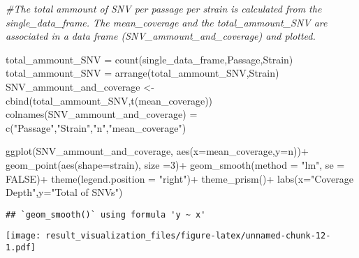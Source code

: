 \documentclass[
]{article}
\newenvironment{Shaded}{\begin{snugshade}}{\end{snugshade}}
\newcommand{\AttributeTok}[1]{\textcolor[rgb]{0.77,0.63,0.00}{#1}}
\newcommand{\CommentTok}[1]{\textcolor[rgb]{0.56,0.35,0.01}{\textit{#1}}}
\newcommand{\ConstantTok}[1]{\textcolor[rgb]{0.00,0.00,0.00}{#1}}
\newcommand{\DecValTok}[1]{\textcolor[rgb]{0.00,0.00,0.81}{#1}}
\newcommand{\FunctionTok}[1]{\textcolor[rgb]{0.00,0.00,0.00}{#1}}
\newcommand{\NormalTok}[1]{#1}
\newcommand{\OtherTok}[1]{\textcolor[rgb]{0.56,0.35,0.01}{#1}}
\newcommand{\SpecialCharTok}[1]{\textcolor[rgb]{0.00,0.00,0.00}{#1}}
\newcommand{\StringTok}[1]{\textcolor[rgb]{0.31,0.60,0.02}{#1}}
\begin{document}
\begin{Shaded}
\begin{Highlighting}[]
\CommentTok{\#The total ammount of SNV per passage per strain is calculated from the single\_data\_frame. The mean\_coverage and the total\_ammount\_SNV are associated in a data frame (SNV\_ammount\_and\_coverage) and plotted.}


\NormalTok{total\_ammount\_SNV }\OtherTok{=} \FunctionTok{count}\NormalTok{(single\_data\_frame,Passage,Strain)}
\NormalTok{total\_ammount\_SNV }\OtherTok{=} \FunctionTok{arrange}\NormalTok{(total\_ammount\_SNV,Strain)}
\NormalTok{SNV\_ammount\_and\_coverage }\OtherTok{\textless{}{-}} \FunctionTok{cbind}\NormalTok{(total\_ammount\_SNV,}\FunctionTok{t}\NormalTok{(mean\_coverage))}
\FunctionTok{colnames}\NormalTok{(SNV\_ammount\_and\_coverage) }\OtherTok{=} \FunctionTok{c}\NormalTok{(}\StringTok{"Passage"}\NormalTok{,}\StringTok{"Strain"}\NormalTok{,}\StringTok{"n"}\NormalTok{,}\StringTok{"mean\_coverage"}\NormalTok{)}

\FunctionTok{ggplot}\NormalTok{(SNV\_ammount\_and\_coverage, }\FunctionTok{aes}\NormalTok{(}\AttributeTok{x=}\NormalTok{mean\_coverage,}\AttributeTok{y=}\NormalTok{n))}\SpecialCharTok{+}
  \FunctionTok{geom\_point}\NormalTok{(}\FunctionTok{aes}\NormalTok{(}\AttributeTok{shape=}\NormalTok{strain), }\AttributeTok{size =}\DecValTok{3}\NormalTok{)}\SpecialCharTok{+}
  \FunctionTok{geom\_smooth}\NormalTok{(}\AttributeTok{method =} \StringTok{"lm"}\NormalTok{, }\AttributeTok{se =} \ConstantTok{FALSE}\NormalTok{)}\SpecialCharTok{+}
  \FunctionTok{theme}\NormalTok{(}\AttributeTok{legend.position =} \StringTok{"right"}\NormalTok{)}\SpecialCharTok{+}
  \FunctionTok{theme\_prism}\NormalTok{()}\SpecialCharTok{+}
  \FunctionTok{labs}\NormalTok{(}\AttributeTok{x=}\StringTok{"Coverage Depth"}\NormalTok{,}\AttributeTok{y=}\StringTok{"Total of SNVs"}\NormalTok{)}
\end{Highlighting}
\end{Shaded}

\begin{verbatim}
## `geom_smooth()` using formula 'y ~ x'
\end{verbatim}

\texttt{[image: result\_visualization\_files/figure-latex/unnamed-chunk-12-1.pdf]}

\begin{Shaded}
\end{Shaded}
\end{document}
